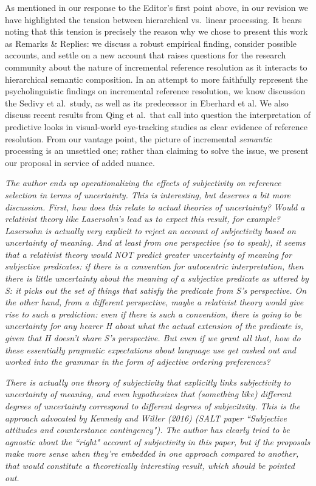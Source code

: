 \documentclass[12pt]{article}
\begin{document}
As mentioned in our response to the Editor's first point above, in our revision we have highlighted the tension between hierarchical vs.~linear processing. It bears noting that this tension is precisely the reason why we chose to present this work as Remarks \& Replies: we discuss a robust empirical finding, consider possible accounts, and settle on a new account that raises questions for the research community about the nature of incremental reference resolution as it interacts to hierarchical semantic composition. In an attempt to more faithfully represent the psycholinguistic findings on incremental reference resolution, we know discussion the Sedivy et al.~study, as well as its predecessor in Eberhard et al. We also discuss recent results from Qing et al.~that call into question the interpretation of predictive looks in visual-world eye-tracking studies as clear evidence of reference resolution. From our vantage point, the picture of incremental \emph{semantic} processing is an unsettled one; rather than claiming to solve the issue, we present our proposal in service of added nuance. 

\item \emph{The author ends up operationalizing the effects of subjectivity on
reference selection in terms of uncertainty.  This is interesting, but
deserves a bit more discussion.  First, how does this relate to actual
theories of uncertainty?  Would a relativist theory like Lasersohn's lead us
to expect this result, for example? Lasersohn is actually very explicit to
reject an account of subjectivity based on uncertainty of meaning. And at
least from one perspective (so to speak), it seems that a relativist theory
would NOT predict greater uncertainty of meaning for subjective predicates: 
if there is a convention for autocentric interpretation, then there is
little uncertainty about the meaning of a subjective predicate as uttered by
S:  it picks out the set of things that satisfy the predicate from S's
perspective.  On the other hand, from a different perspective, maybe a
relativist theory would give rise to such a prediction:  even if there is
such a convention, there is going to be uncertainty for any hearer H about
what the actual extension of the predicate is, given that H doesn't share
S's perspective.  But even if we grant all that, how do these essentially
pragmatic expectations about language use get cashed out and worked into the
grammar in the form of adjective ordering preferences?}

\emph{There is actually one theory of subjectivity that explicitly links
subjectivity to uncertainty of meaning, and even hypothesizes that
(something like) different degrees of uncertainty correspond to different
degrees of subjecitvity.  This is the approach advocated by Kennedy and
Willer (2016) (SALT paper ``Subjective attitudes and counterstance
contingency").  The author has clearly tried to be agnostic about the
``right" account of subjectivity in this paper, but if the proposals make
more sense when they're embedded in one approach compared to another, that
would constitute a theoretically interesting result, which should be pointed
out.}
\end{document}
